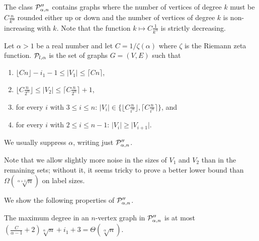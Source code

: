 The class $ \mathcal{P}''_{\alpha,n}$ contains graphs where  the number of vertices of degree $k$
must be $C \frac{n}{k^{\alpha}}$ rounded either up or down and the number of vertices of degree $k$ is non-increasing
with $k$. Note that the function $k \mapsto  C \frac{1}{k^{\alpha}}$ is strictly decreasing.

\begin{definition}\label{def:proper}
Let $\alpha > 1$ be a real number and let $C = 1/\zeta(\alpha)$ where $\zeta$ is the Riemann zeta function. $ \mathcal{P}_{l,\alpha}$ is the set of graphs  $G=(V,E)$ such that
\begin{enumerate}
\item $\lfloor Cn\rfloor - i_1 - 1\leq\vert V_1\vert\leq\lceil Cn\rceil$,
\item $\lfloor C\frac n{2^\alpha}\rfloor\leq\vert V_2\vert\leq\lceil C\frac n{2^\alpha}\rceil + 1$,
\item for every $i$ with $3 \leq i \leq n$:  $\vert V_i \vert\in \{\lfloor C\frac{n}{i^{\alpha}} \rfloor, \lceil C \frac{n}{i^{\alpha}} \rceil\}$, and
\item for every $i$ with $2 \leq i \leq n-1$: $\vert V_i \vert \geq \vert V_{i+1} \vert$.
\end{enumerate}
We usually suppress $\alpha$, writing just $ \mathcal{P}''_{\alpha,n}$.
\end{definition}
Note that we allow slightly more noise in the sizes of $V_1$ and $V_2$ than in the remaining sets; without it, it seems tricky to prove a better lower bound than $\Omega(\sqrt[\alpha+1]{n})$ on label sizes.

We show the following properties of $ \mathcal{P}''_{\alpha,n}$. 
\begin{proposition}\label{prop:maxvertexproper}\label{prop:maxdegree}
The maximum degree in an $n$-vertex graph in $ \mathcal{P}''_{\alpha,n}$ is at most $\left(\frac{C}{\alpha - 1} + 2\right) \sqrt[\alpha]{n} + i_1 + 3 = \Theta(\sqrt[\alpha]n)$.
\end{proposition}


